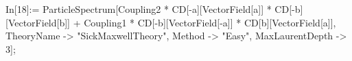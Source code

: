 In[18]:= ParticleSpectrum[Coupling2 * CD[-a][VectorField[a]] * CD[-b][VectorField[b]] + Coupling1 * CD[-b][VectorField[-a]] * CD[b][VectorField[a]], TheoryName -> "SickMaxwellTheory", Method -> "Easy", MaxLaurentDepth -> 3]; 